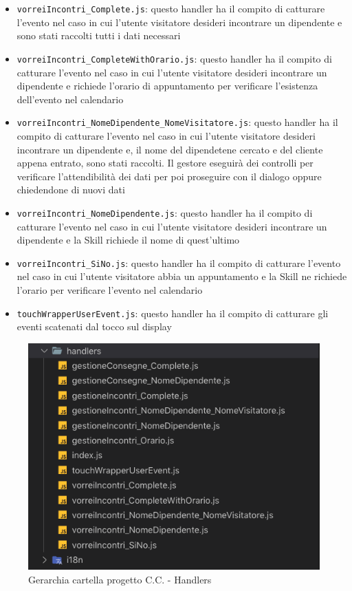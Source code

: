 \begin{itemize}
    \item \texttt{vorreiIncontri\_Complete.js}: questo handler ha il compito di catturare l'evento nel caso in cui l'utente visitatore desideri incontrare un dipendente e sono stati raccolti tutti i dati necessari 
    \item \texttt{vorreiIncontri\_CompleteWithOrario.js}: questo handler ha il compito di catturare l'evento nel caso in cui l'utente visitatore desideri incontrare un dipendente e richiede l'orario di appuntamento per verificare l'esistenza dell'evento nel calendario 
    \item \texttt{vorreiIncontri\_NomeDipendente\_NomeVisitatore.js}: questo handler ha il compito di catturare l'evento nel caso in cui l'utente visitatore desideri incontrare un dipendente e, il nome del dipendetene cercato e del cliente appena entrato, sono stati raccolti. Il gestore eseguirà dei controlli per verificare l'attendibilità dei dati per poi proseguire con il dialogo oppure chiedendone di nuovi dati
    \item \texttt{vorreiIncontri\_NomeDipendente.js}: questo handler ha il compito di catturare l'evento nel caso in cui l'utente visitatore desideri incontrare un dipendente e la Skill richiede il nome di quest'ultimo
    \item \texttt{vorreiIncontri\_SiNo.js}: questo handler ha il compito di catturare l'evento nel caso in cui l'utente visitatore abbia un appuntamento e la Skill ne richiede l'orario per verificare l'evento nel calendario
    \item \texttt{touchWrapperUserEvent.js}: questo handler ha il compito di catturare gli eventi scatenati dal tocco sul display 
\end{itemize}
\begin{figure}[H]
	\includegraphics[width=13cm]{immagini/skill-folder2.png}
	\caption{\label{fig:aws_lambda_regione}Gerarchia cartella progetto C.C. - Handlers}
\end{figure}
